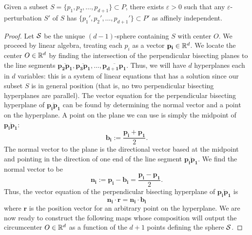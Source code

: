 \documentclass[letterpaper,titlepage]{article}
\begin{document}
    \begin{lem}\label{affine_indep_lemma}
        Given a subset $S= \{p_1,p_2,\dots,p_{d+1}\} \subset P$, there exists $\varepsilon>0$ such that any $\varepsilon$-perturbation $S'$ of $S$ has $\{p_1',p_2',\dots,p_{d+1}'\} \subset P'$ as affinely independent.
    \end{lem}
    \begin{proof}
        Let $\mathcal{S}$ be the unique $(d-1)$-sphere containing $S$ with center $O$. We proceed by linear algebra, treating each $p_i$ as a vector $\mathbf{p_i} \in \mathbb{R}^d$. We locate the center $O \in \mathbb{R}^d$ by finding the intersection of the perpendicular bisecting planes to the line segments $\overline{\mathbf{p_2}\mathbf{p_1}}, \overline{\mathbf{p_3}\mathbf{p_1}}, \dots, \overline{\mathbf{p_{d+1}}\mathbf{p_1}}$.
        Thus, we will have $d$ hyperplanes each in $d$ variables: this is a system of linear equations that has a solution since our subset $S$ is in general position (that is, no two perpendicular bisecting hyperplanes are parallel). The vector equation for the perpendicular bisecting hyperplane of $\overline{\mathbf{p_i}\mathbf{p_1}}$ can be found by determining the normal vector and a point on the hyperplane. A point on the plane we can use is simply the midpoint of $\overline{\mathbf{p_i}\mathbf{p_1}}$:
        $$\mathbf{b_i} := \frac{\mathbf{p_i}+\mathbf{p_1}}{2}.$$
        The normal vector to the plane is the directional vector based at the midpoint and pointing in the direction of one end of the line segment $\overline{\mathbf{p_i}\mathbf{p_1}}$. We find the normal vector to be
        $$\mathbf{n_i} := \mathbf{p_i}-\mathbf{b_i} = \frac{\mathbf{p_i}-\mathbf{p_1}}{2}.$$
        Thus, the vector equation of the perpendicular bisecting hyperplane of $\overline{\mathbf{p_i}\mathbf{p_1}}$ is
        $$\mathbf{n_i}\cdot \mathbf{r}=\mathbf{n_i}\cdot\mathbf{b_i}$$
        where $\mathbf{r}$ is the position vector for an arbitrary point on the hyperplane.
        \newline
        We are now ready to construct the following maps whose composition will output the circumcenter $O \in \mathbb{R}^d$ as a function of the $d+1$ points defining the sphere $\mathcal{S}$.


\end{proof}
\end{document}
